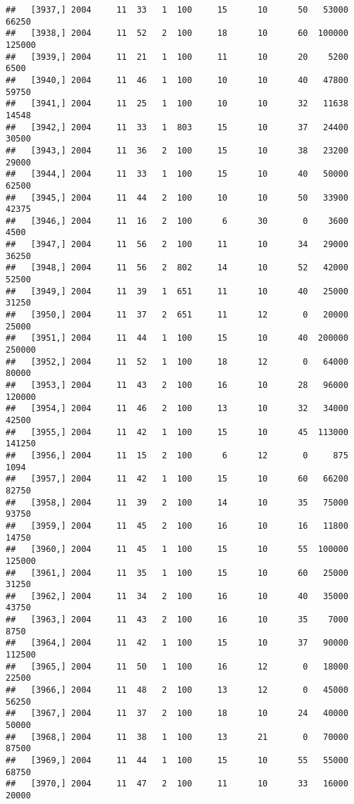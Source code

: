 \documentclass{article}\usepackage[]{graphicx}\usepackage[]{color}
\makeatletter
\newenvironment{kframe}{%
 \def\at@end@of@kframe{}%
 \ifinner\ifhmode%
  \def\at@end@of@kframe{\end{minipage}}%
  \begin{minipage}{\columnwidth}%
 \fi\fi%
 \def\FrameCommand##1{\hskip\@totalleftmargin \hskip-\fboxsep
 \colorbox{shadecolor}{##1}\hskip-\fboxsep
     \hskip-\linewidth \hskip-\@totalleftmargin \hskip\columnwidth}%
 \MakeFramed {\advance\hsize-\width
   \@totalleftmargin\z@ \linewidth\hsize
   \@setminipage}}%
 {\par\unskip\endMakeFramed%
 \at@end@of@kframe}
\newenvironment{knitrout}{}{} %
\makeatother
\begin{document}
\begin{knitrout}
\begin{kframe}
\begin{verbatim}
##   [3937,] 2004     11  33   1  100     15      10      50   53000   66250
##   [3938,] 2004     11  52   2  100     18      10      60  100000  125000
##   [3939,] 2004     11  21   1  100     11      10      20    5200    6500
##   [3940,] 2004     11  46   1  100     10      10      40   47800   59750
##   [3941,] 2004     11  25   1  100     10      10      32   11638   14548
##   [3942,] 2004     11  33   1  803     15      10      37   24400   30500
##   [3943,] 2004     11  36   2  100     15      10      38   23200   29000
##   [3944,] 2004     11  33   1  100     15      10      40   50000   62500
##   [3945,] 2004     11  44   2  100     10      10      50   33900   42375
##   [3946,] 2004     11  16   2  100      6      30       0    3600    4500
##   [3947,] 2004     11  56   2  100     11      10      34   29000   36250
##   [3948,] 2004     11  56   2  802     14      10      52   42000   52500
##   [3949,] 2004     11  39   1  651     11      10      40   25000   31250
##   [3950,] 2004     11  37   2  651     11      12       0   20000   25000
##   [3951,] 2004     11  44   1  100     15      10      40  200000  250000
##   [3952,] 2004     11  52   1  100     18      12       0   64000   80000
##   [3953,] 2004     11  43   2  100     16      10      28   96000  120000
##   [3954,] 2004     11  46   2  100     13      10      32   34000   42500
##   [3955,] 2004     11  42   1  100     15      10      45  113000  141250
##   [3956,] 2004     11  15   2  100      6      12       0     875    1094
##   [3957,] 2004     11  42   1  100     15      10      60   66200   82750
##   [3958,] 2004     11  39   2  100     14      10      35   75000   93750
##   [3959,] 2004     11  45   2  100     16      10      16   11800   14750
##   [3960,] 2004     11  45   1  100     15      10      55  100000  125000
##   [3961,] 2004     11  35   1  100     15      10      60   25000   31250
##   [3962,] 2004     11  34   2  100     16      10      40   35000   43750
##   [3963,] 2004     11  43   2  100     16      10      35    7000    8750
##   [3964,] 2004     11  42   1  100     15      10      37   90000  112500
##   [3965,] 2004     11  50   1  100     16      12       0   18000   22500
##   [3966,] 2004     11  48   2  100     13      12       0   45000   56250
##   [3967,] 2004     11  37   2  100     18      10      24   40000   50000
##   [3968,] 2004     11  38   1  100     13      21       0   70000   87500
##   [3969,] 2004     11  44   1  100     15      10      55   55000   68750
##   [3970,] 2004     11  47   2  100     11      10      33   16000   20000

\end{verbatim}
\end{kframe}
\end{knitrout}
\end{document}
